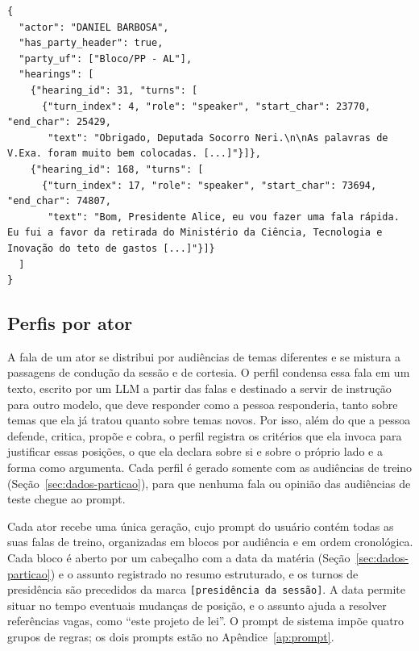 \begin{lstlisting}[float=tbp,caption={Exemplo de registro de falas por ator, restrito às audiências
de treino. Os textos foram truncados em {[\ldots]}, e o campo com a concatenação dos turnos de cada
audiência foi omitido.},label=lst:ator]
{
  "actor": "DANIEL BARBOSA",
  "has_party_header": true,
  "party_uf": ["Bloco/PP - AL"],
  "hearings": [
    {"hearing_id": 31, "turns": [
      {"turn_index": 4, "role": "speaker", "start_char": 23770, "end_char": 25429,
       "text": "Obrigado, Deputada Socorro Neri.\n\nAs palavras de V.Exa. foram muito bem colocadas. [...]"}]},
    {"hearing_id": 168, "turns": [
      {"turn_index": 17, "role": "speaker", "start_char": 73694, "end_char": 74807,
       "text": "Bom, Presidente Alice, eu vou fazer uma fala rápida. Eu fui a favor da retirada do Ministério da Ciência, Tecnologia e Inovação do teto de gastos [...]"}]}
  ]
}
\end{lstlisting}

\subsection{Perfis por ator}
\label{sec:metodo-perfis}

A fala de um ator se distribui por audiências de temas diferentes e se mistura a passagens de
condução da sessão e de cortesia. O perfil condensa essa fala em um texto, escrito por um LLM a
partir das falas e destinado a servir de instrução para outro modelo, que deve responder como a
pessoa responderia, tanto sobre temas que ela já tratou quanto sobre temas novos. Por isso, além do
que a pessoa defende, critica, propõe e cobra, o perfil registra os critérios que ela invoca para
justificar essas posições, o que ela declara sobre si e sobre o próprio lado e a forma como argumenta.
Cada perfil é gerado somente com as audiências de treino (Seção~\ref{sec:dados-particao}), para que
nenhuma fala ou opinião das audiências de teste chegue ao prompt.

Cada ator recebe uma única geração, cujo prompt do usuário contém todas as suas falas de treino,
organizadas em blocos por audiência e em ordem cronológica. Cada bloco é aberto por um cabeçalho com a
data da matéria (Seção~\ref{sec:dados-particao}) e o assunto registrado no resumo estruturado, e os turnos de
presidência são precedidos da marca \texttt{[presidência da sessão]}. A data permite situar no tempo
eventuais mudanças de posição, e o assunto ajuda a resolver referências vagas, como ``este projeto
de lei''. O prompt de sistema impõe quatro grupos de regras; os dois prompts estão no
Apêndice~\ref{ap:prompt}.

